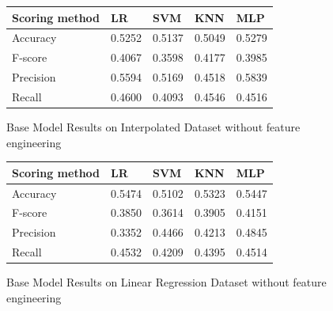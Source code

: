 \documentclass[8pt]{article}
\begin{document}
\begin{figure}[H]
    \centering
    \begin{tabular}{ |p{3cm}||p{3cm}|p{3cm}|p{3cm}|p{3cm}| }
\hline
Scoring method & LR & SVM & KNN & MLP \\
\hline
 Accuracy & 0.5252 & 0.5137 & 0.5049 & 0.5279\\
 F-score & 0.4067 & 0.3598 & 0.4177 & 0.3985\\
 Precision & 0.5594 & 0.5169 & 0.4518 & 0.5839\\
 Recall & 0.4600 & 0.4093 & 0.4546 & 0.4516\\
\hline
\end{tabular}
    \caption{Base Model Results on Interpolated Dataset without feature engineering}
    \label{fig:tableA}
\end{figure}
\begin{figure}[H]
    \centering
    \begin{tabular}{ |p{3cm}||p{3cm}|p{3cm}|p{3cm}|p{3cm}| }
 \hline
 Scoring method & LR & SVM & KNN & MLP\\
 \hline
 Accuracy & 0.5474 & 0.5102 & 0.5323 & 0.5447\\
 F-score & 0.3850 & 0.3614 & 0.3905 & 0.4151\\
 Precision & 0.3352 & 0.4466 & 0.4213 & 0.4845\\
 Recall & 0.4532 & 0.4209 & 0.4395 & 0.4514\\
\hline
\end{tabular}

    \caption{Base Model Results on Linear Regression Dataset without feature engineering}
    \label{fig:tableB}
\end{figure}

\end{document}
